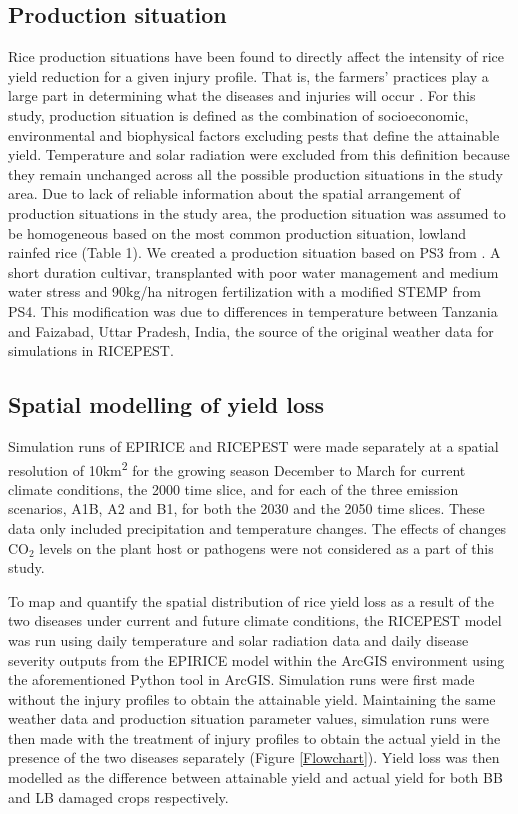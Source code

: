    \subsection{Production situation}
    \label{production_situation}
    Rice production situations have been found to directly affect the intensity of rice yield reduction for a given injury profile. That is, the farmers' practices play a large part in determining what the diseases and injuries will occur \citep{Savary2000}. For this study, production situation is defined as the combination of socioeconomic, environmental and biophysical factors excluding pests that define the attainable yield. Temperature and solar radiation were excluded from this definition because they remain unchanged across all the possible production situations in the study area. Due to lack of reliable information about the spatial arrangement of production situations in the study area, the production situation was assumed to be homogeneous based on the most common production situation, lowland rainfed rice \citep{Diagne2013} (Table 1). We created a production situation based on PS3 from \citep{Willocquet2004}. A short duration cultivar, transplanted with poor water management and medium water stress and 90kg/ha nitrogen fertilization with a modified STEMP from PS4. This modification was due to differences in temperature between Tanzania and Faizabad, Uttar Pradesh, India, the source of the original weather data for simulations in RICEPEST.
    
    \subsection{Spatial modelling of yield loss}
    \label{modelling_yield_loss}
    Simulation runs of EPIRICE and RICEPEST were made separately at a spatial resolution of 10km\textsuperscript{2} for the growing season December to March for current climate conditions, the 2000 time slice, and for each of the three emission scenarios, A1B, A2 and B1, for both the 2030 and the 2050 time slices. These data only included precipitation and temperature changes. The effects of changes CO$_{2}$ levels on the plant host or pathogens were not considered as a part of this study.
    
    To map and quantify the spatial distribution of rice yield loss as a result of the two diseases under current and future climate conditions, the RICEPEST model was run using daily temperature and solar radiation data and daily disease severity outputs from the EPIRICE model within the ArcGIS environment using the aforementioned Python tool in ArcGIS. Simulation runs were first made without the injury profiles to obtain the attainable yield. Maintaining the same weather data and production situation parameter values, simulation runs were then made with the treatment of injury profiles to obtain the actual yield in the presence of the two diseases separately (Figure \ref{Flowchart}). Yield loss was then modelled as the difference between attainable yield and actual yield for both BB and LB damaged crops respectively.
    
